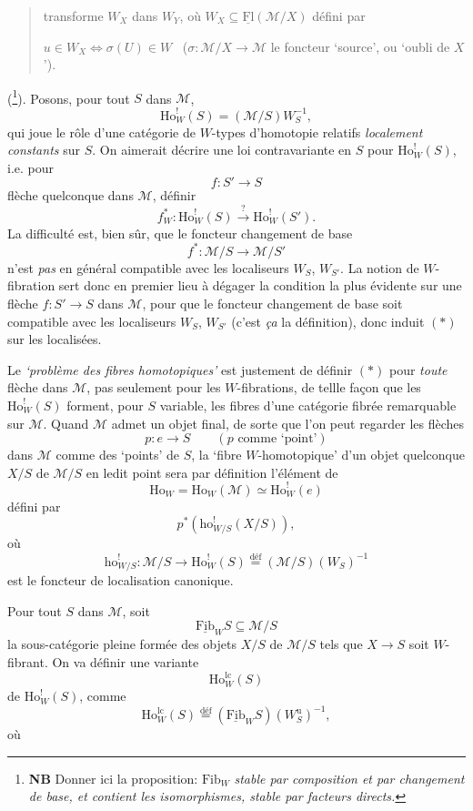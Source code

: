 \documentclass[11pt]{article}
\newcommand{\printedpage}[1]{{\reversemarginpar\marginnote{\raggedleft\scriptsize ed.~#1}}}
\newcommand{\msp}[1]{\marginpar{\raggedright\scriptsize ms.~#1}}
\newcommand{\Fib}{\underline{\mathrm{Fib}}}
\newcommand{\Fl}{\underline{\mathrm{Fl}}}
\newcommand{\cM}{\mathcal{M}}
\newcommand{\Ho}{\mathrm{Ho}}
\newcommand{\ho}{\mathrm{ho}}
\newcommand{\Wu}{W^{\mathrm{u}}}
\newcommand{\lc}{\mathrm{lc}}
\begin{document}
\printedpage{135}

\begin{quote}
transforme $W_X$ dans $W_Y$, où $W_X \subseteq \Fl(\cM/X)$ défini par

$u \in W_X \iff \sigma(U) \in W$ \ ($\sigma : \cM/X \longrightarrow \cM$ le foncteur ‘source’, ou ‘oubli de $X$’). %
\end{quote}

(\footnote[120]{\textbf{NB} Donner ici la proposition: $\mathrm{Fib}_W$ \textit{stable par composition et par changement de base, et contient les isomorphismes, stable par facteurs directs.}}). Posons, pour tout $S$ dans $\cM$,
\[
\Ho^!_W(S) = (\cM/S)W_S^{-1},
\]
qui joue le rôle d'une catégorie de $W$-types d'homotopie relatifs \textit{localement constants} sur $S$. On aimerait décrire une loi contravariante en $S$ pour $\Ho^!_W(S)$, i.e. pour
\[
f : S' \longrightarrow S
\]
flèche quelconque dans $\cM$, définir
\[
f^*_W : \Ho^!_W(S) \xrightarrow{?} \Ho^!_W(S'). \tag*{$(*)$}
\]
La difficulté est, bien sûr, que le foncteur changement de base
\[
f^* : \cM/S \longrightarrow \cM/S'
\]
n'est \textit{pas} en général compatible avec les \msp{page 209} localiseurs $W_S$, $W_{S'}$. La notion de $W$-fibration sert donc en premier lieu à dégager la condition la plus évidente sur une flèche $f : S' \longrightarrow S$ dans $\cM$, pour que le foncteur changement de base soit compatible avec les localiseurs $W_S$, $W_{S'}$ (c'est \textit{ça} la définition), donc induit $(*)$ sur les localisées.

Le \textit{‘problème des fibres homotopiques’} est justement de définir $(*)$ pour \textit{toute} flèche dans $\cM$, pas seulement pour les $W$-fibrations, de tellle façon que les $\Ho^!_W(S)$ forment, pour $S$ %
variable, les fibres d'une catégorie fibrée remarquable sur $\cM$. Quand $\cM$ admet un objet final, de sorte que l'on peut regarder les flèches
\[
p : e \longrightarrow S \qquad (p \text{ comme ‘point’})
\]
dans $\cM$ comme des ‘points’ de $S$, la ‘fibre $W$-homotopique’ d'un objet quelconque $X/S$ de $\cM/S$ en ledit point sera par définition l'élément de
\[
\Ho_W = \Ho_W(\cM) \simeq \Ho^!_W(e)
\]
défini par
\[
p^*(\ho^!_{W/S}(X/S)),
\]
\printedpage{136}
\msp{page 210}
où
\[
\ho^!_{W/S} : \cM/S \longrightarrow \Ho^!_W(S) \overset{\text{déf}}{=} (\cM/S)(W_S)^{-1}
\]
est le foncteur de localisation canonique.

Pour tout $S$ dans $\cM$, soit
\[
\Fib_W S \subseteq \cM/S
\]
la sous-catégorie pleine formée des objets $X/S$ de $\cM/S$ tels que $X \longrightarrow S$ soit $W$-fibrant. On va définir une variante
\[
\Ho^{\lc}_W(S)
\]
de $\Ho^!_W(S)$, comme
\[
\Ho^{\lc}_W(S) \overset{\text{déf}}{=} (\Fib_W S)(\Wu_S)^{-1},
\]
où
\end{document}
